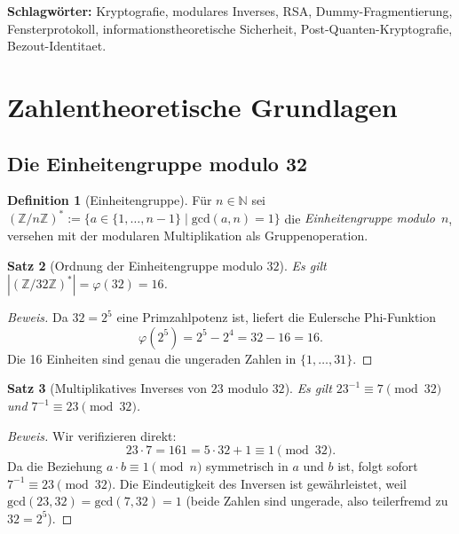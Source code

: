 ﻿\documentclass[12pt, a4paper]{article}
\theoremstyle{plain}
\newtheorem{theorem}{Satz}[section]
\theoremstyle{definition}
\newtheorem{definition}[theorem]{Definition}
\theoremstyle{remark}
\newenvironment{myproof}[1][Beweis]{%
  \begin{proof}[#1]
}{%
  \end{proof}
}
\newcommand{\Z}{\mathbb{Z}}
\newcommand{\N}{\mathbb{N}}
\newcommand{\GCD}{\mathrm{gcd}}
\begin{document}
\textbf{Schlagwörter:} Kryptografie, modulares Inverses, RSA,
Dummy-Fragmentierung, Fensterprotokoll, informationstheoretische Sicherheit,
Post-Quanten-Kryptografie, Bezout-Identitaet.

\section{Zahlentheoretische Grundlagen}
\label{sec:grundlagen}

\subsection{Die Einheitengruppe modulo 32}

\begin{definition}[Einheitengruppe]\label{def:einheitengruppe}
  F\"ur $n \in \N$ sei $(\Z/n\Z)^* := \{a \in \{1,\ldots,n-1\} \mid \GCD(a,n)=1\}$
  die \emph{Einheitengruppe modulo~$n$}, versehen mit der modularen Multiplikation
  als Gruppenoperation.
\end{definition}

\begin{theorem}[Ordnung der Einheitengruppe modulo $32$]\label{thm:ordnung32}
  Es gilt $|(\Z/32\Z)^*| = \varphi(32) = 16$.
\end{theorem}

\begin{myproof}
  Da $32 = 2^5$ eine Primzahlpotenz ist, liefert die Eulersche Phi-Funktion
  \[
    \varphi(2^5) = 2^5 - 2^4 = 32 - 16 = 16.
  \]
  Die 16 Einheiten sind genau die ungeraden Zahlen in $\{1,\ldots,31\}$.
\end{myproof}

\begin{theorem}[Multiplikatives Inverses von $23$ modulo $32$]\label{thm:inverses}
  Es gilt $23^{-1} \equiv 7 \pmod{32}$ und $7^{-1} \equiv 23 \pmod{32}$.
\end{theorem}

\begin{myproof}
  Wir verifizieren direkt:
  \[
    23 \cdot 7 = 161 = 5 \cdot 32 + 1 \equiv 1 \pmod{32}.
  \]
  Da die Beziehung $a \cdot b \equiv 1 \pmod{n}$ symmetrisch in $a$ und $b$ ist,
  folgt sofort $7^{-1} \equiv 23 \pmod{32}$.
  Die Eindeutigkeit des Inversen ist gew\"ahrleistet, weil
  $\GCD(23, 32) = \GCD(7, 32) = 1$ (beide Zahlen sind ungerade, also teilerfremd
  zu $32 = 2^5$).
\end{myproof}
\end{document}
